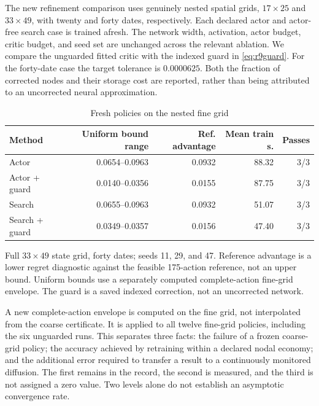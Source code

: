 The new refinement comparison uses genuinely nested spatial grids, $17\times25$ and $33\times49$, with twenty and forty dates, respectively. Each declared actor and actor-free search case is trained afresh. The network width, activation, actor budget, critic budget, and seed set are unchanged across the relevant ablation. We compare the unguarded fitted critic with the indexed guard in \eqref{eq:r9guard}. For the forty-date case the target tolerance is $0.0000625$. Both the fraction of corrected nodes and their storage cost are reported, rather than being attributed to an uncorrected neural approximation.

\begin{table}[htbp]
\centering\small\setlength{\tabcolsep}{4pt}
\caption{Fresh policies on the nested fine grid}\label{tab:r9nested}
\begin{tabular}{lrrrr}
\toprule
Method & Uniform bound range & Ref. advantage & Mean train s. & Passes \\
\midrule
Actor & 0.0654--0.0963 & 0.0932 & 88.32 & 3/3 \\
Actor + guard & 0.0140--0.0356 & 0.0155 & 87.75 & 3/3 \\
Search & 0.0655--0.0963 & 0.0932 & 51.07 & 3/3 \\
Search + guard & 0.0349--0.0357 & 0.0156 & 47.40 & 3/3 \\
\bottomrule
\end{tabular}
\par\vspace{3pt}\begin{minipage}{0.97\linewidth}\footnotesize Full $33\times49$ state grid, forty dates; seeds 11, 29, and 47. Reference advantage is a lower regret diagnostic against the feasible 175-action reference, not an upper bound. Uniform bounds use a separately computed complete-action fine-grid envelope. The guard is a saved indexed correction, not an uncorrected network.\end{minipage}
\end{table}


A new complete-action envelope is computed on the fine grid, not interpolated from the coarse certificate. It is applied to all twelve fine-grid policies, including the six unguarded runs. This separates three facts: the failure of a frozen coarse-grid policy; the accuracy achieved by retraining within a declared nodal economy; and the additional error required to transfer a result to a continuously monitored diffusion. The first remains in the record, the second is measured, and the third is not assigned a zero value. Two levels alone do not establish an asymptotic convergence rate.

